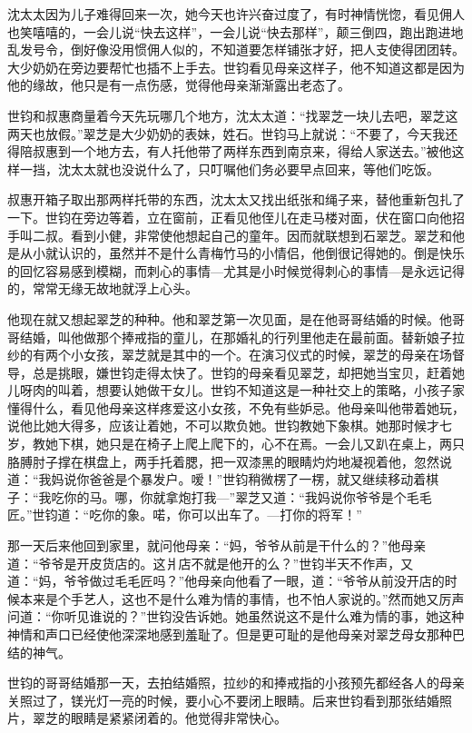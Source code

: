 \par 沈太太因为儿子难得回来一次，她今天也许兴奋过度了，有时神情恍惚，看见佣人也笑嘻嘻的，一会儿说“快去这样”，一会儿说“快去那样”，颠三倒四，跑出跑进地乱发号令，倒好像没用惯佣人似的，不知道要怎样铺张才好，把人支使得团团转。大少奶奶在旁边要帮忙也插不上手去。世钧看见母亲这样子，他不知道这都是因为他的缘故，他只是有一点伤感，觉得他母亲渐渐露出老态了。
\par 世钧和叔惠商量着今天先玩哪几个地方，沈太太道：“找翠芝一块儿去吧，翠芝这两天也放假。”翠芝是大少奶奶的表妹，姓石。世钧马上就说：“不要了，今天我还得陪叔惠到一个地方去，有人托他带了两样东西到南京来，得给人家送去。”被他这样一挡，沈太太就也没说什么了，只叮嘱他们务必要早点回来，等他们吃饭。
\par 叔惠开箱子取出那两样托带的东西，沈太太又找出纸张和绳子来，替他重新包扎了一下。世钧在旁边等着，立在窗前，正看见他侄儿在走马楼对面，伏在窗口向他招手叫二叔。看到小健，非常使他想起自己的童年。因而就联想到石翠芝。翠芝和他是从小就认识的，虽然并不是什么青梅竹马的小情侣，他倒很记得她的。倒是快乐的回忆容易感到模糊，而刺心的事情—尤其是小时候觉得刺心的事情—是永远记得的，常常无缘无故地就浮上心头。
\par 他现在就又想起翠芝的种种。他和翠芝第一次见面，是在他哥哥结婚的时候。他哥哥结婚，叫他做那个捧戒指的童儿，在那婚礼的行列里他走在最前面。替新娘子拉纱的有两个小女孩，翠芝就是其中的一个。在演习仪式的时候，翠芝的母亲在场督导，总是挑眼，嫌世钧走得太快了。世钧的母亲看见翠芝，却把她当宝贝，赶着她儿呀肉的叫着，想要认她做干女儿。世钧不知道这是一种社交上的策略，小孩子家懂得什么，看见他母亲这样疼爱这小女孩，不免有些妒忌。他母亲叫他带着她玩，说他比她大得多，应该让着她，不可以欺负她。世钧教她下象棋。她那时候才七岁，教她下棋，她只是在椅子上爬上爬下的，心不在焉。一会儿又趴在桌上，两只胳膊肘子撑在棋盘上，两手托着腮，把一双漆黑的眼睛灼灼地凝视着他，忽然说道：“我妈说你爸爸是个暴发户。嗳！”世钧稍微楞了一楞，就又继续移动着棋子：“我吃你的马。哪，你就拿炮打我—”翠芝又道：“我妈说你爷爷是个毛毛匠。”世钧道：“吃你的象。喏，你可以出车了。—打你的将军！”
\par 那一天后来他回到家里，就问他母亲：“妈，爷爷从前是干什么的？”他母亲道：“爷爷是开皮货店的。这爿店不就是他开的么？”世钧半天不作声，又道：“妈，爷爷做过毛毛匠吗？”他母亲向他看了一眼，道：“爷爷从前没开店的时候本来是个手艺人，这也不是什么难为情的事情，也不怕人家说的。”然而她又厉声问道：“你听见谁说的？”世钧没告诉她。她虽然说这不是什么难为情的事，她这种神情和声口已经使他深深地感到羞耻了。但是更可耻的是他母亲对翠芝母女那种巴结的神气。
\par 世钧的哥哥结婚那一天，去拍结婚照，拉纱的和捧戒指的小孩预先都经各人的母亲关照过了，镁光灯一亮的时候，要小心不要闭上眼睛。后来世钧看到那张结婚照片，翠芝的眼睛是紧紧闭着的。他觉得非常快心。
